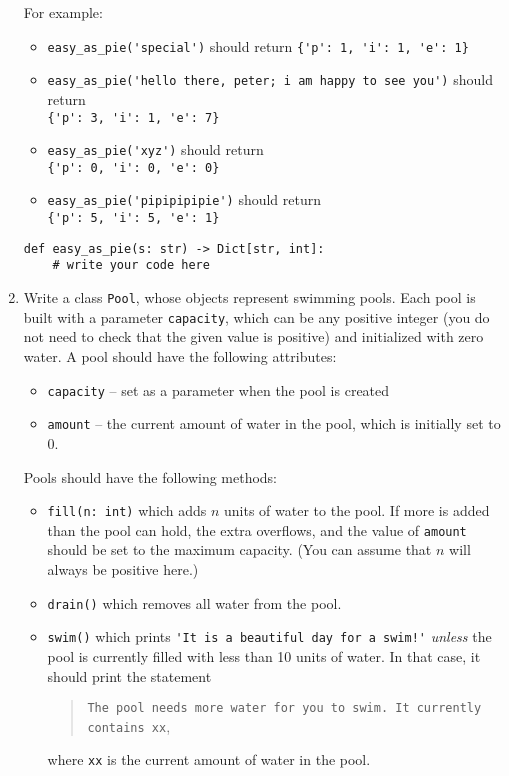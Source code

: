 \documentclass{article}
\begin{document}
\begin{enumerate}
    For example:
    \begin{itemize}
    \item \verb|easy_as_pie('special')| should return \verb|{'p': 1, 'i': 1, 'e': 1}|
      \item \verb|easy_as_pie('hello there, peter; i am happy to see you')| should return\\  \verb|{'p': 3, 'i': 1, 'e': 7}|
      \item \verb|easy_as_pie('xyz')| should return \\ \verb|{'p': 0, 'i': 0, 'e': 0}|
      \item \verb|easy_as_pie('pipipipipie')| should return \\ \verb|{'p': 5, 'i': 5, 'e': 1}|
    \end{itemize}

    \vspace{0.3in}

\begin{verbatim}
def easy_as_pie(s: str) -> Dict[str, int]:
    # write your code here

\end{verbatim}
\newpage
\item Write a class \verb|Pool|, whose objects represent swimming pools. Each pool is built with a parameter \verb|capacity|, which can be any positive integer (you do not need to check that the given value is positive) and initialized with zero water. A pool should have the following attributes:
    \begin{itemize}
      \item \verb|capacity| -- set as a parameter when the pool is created
      \item \verb|amount| -- the current amount of water in the pool, which is initially set to 0.
    \end{itemize}

    Pools should have the following methods:
    \begin{itemize}
      \item \verb|fill(n: int)| which adds $n$ units of water to the pool. If more is added than the pool can hold, the extra overflows, and the value of \verb|amount| should be set to the maximum capacity. (You can assume that $n$ will always be positive here.)
      \item \verb|drain()| which removes all water from the pool.
      \item \verb|swim()| which prints %
        \verb|'It is a beautiful day for a swim!'| \emph{unless} the
        pool is currently filled with less than 10 units of water. In
        that case, it should print the statement
        \begin{quote}
        \texttt{The pool needs more water for you to swim. It currently contains xx},
        \end{quote}
        where \verb|xx| is the current amount of water in the pool.
    \end{itemize}


\end{enumerate}
\end{document}
